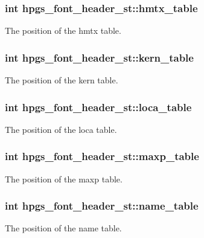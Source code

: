 \subsubsection[{hmtx\_\-table}]{\setlength{\rightskip}{0pt plus 5cm}int {\bf hpgs\_\-font\_\-header\_\-st::hmtx\_\-table}}\label{structhpgs__font__header__st_a5b6510174b7573a836323b837c36af65}
The position of the hmtx table. 
\subsubsection[{kern\_\-table}]{\setlength{\rightskip}{0pt plus 5cm}int {\bf hpgs\_\-font\_\-header\_\-st::kern\_\-table}}\label{structhpgs__font__header__st_ad3548a900071302b64d154c9d3875ec2}
The position of the kern table. 
\subsubsection[{loca\_\-table}]{\setlength{\rightskip}{0pt plus 5cm}int {\bf hpgs\_\-font\_\-header\_\-st::loca\_\-table}}\label{structhpgs__font__header__st_a08577d0c6d7f3565618c3632996c4073}
The position of the loca table. 
\subsubsection[{maxp\_\-table}]{\setlength{\rightskip}{0pt plus 5cm}int {\bf hpgs\_\-font\_\-header\_\-st::maxp\_\-table}}\label{structhpgs__font__header__st_a3b6087f86dd4d7b44416244797e29c84}
The position of the maxp table. 
\subsubsection[{name\_\-table}]{\setlength{\rightskip}{0pt plus 5cm}int {\bf hpgs\_\-font\_\-header\_\-st::name\_\-table}}\label{structhpgs__font__header__st_a1adba6dba263ca70554b4d4964aafeb7}
The position of the name table. 
